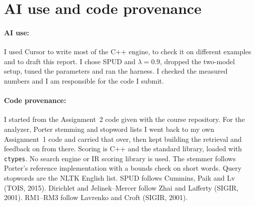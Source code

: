 \documentclass[10pt,a4paper]{article}
\begin{document}
\section{AI use and code provenance}

\paragraph{AI use:}
I used Cursor to write most of the C++ engine, to check it on different examples and to draft this report. I chose SPUD and $\lambda{=}0.9$, dropped the two-model setup, tuned the parameters and ran the harness. I checked the measured numbers and I am responsible for the code I submit.

\paragraph{Code provenance: }
I started from the Assignment~2 code given with the course repository. For the analyzer, Porter stemming and stopword lists I went back to my own Assignment~1 code and carried that over, then kept building the retrieval and feedback on from there. Scoring is C++ and the standard library, loaded with \texttt{ctypes}. No search engine or IR scoring library is used. The stemmer follows Porter's reference implementation with a bounds check on short words. Query stopwords are the NLTK English list. SPUD follows Cummins, Paik and Lv (TOIS, 2015). Dirichlet and Jelinek--Mercer follow Zhai and Lafferty (SIGIR, 2001). RM1--RM3 follow Lavrenko and Croft (SIGIR, 2001).
 
\end{document}
